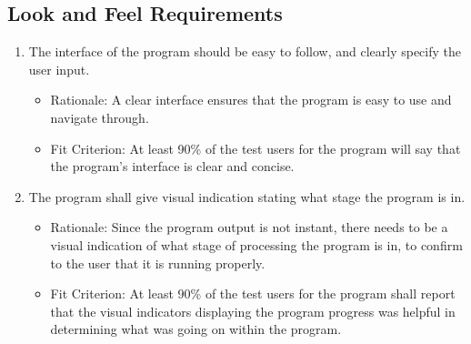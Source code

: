 \documentclass[12pt, titlepage]{article}
\begin{document}
\subsection{Look and Feel Requirements}
\begin{enumerate}[{LF}1. ] 
    \item \label{LF1} The interface of the program should be easy to follow, and clearly specify the user input.
    \begin{itemize} 
        \item Rationale: A clear interface ensures that the program is easy to use and navigate through.
        \item Fit Criterion: At least 90\% of the test users for the program will say that the program's interface is clear and concise.
    \end{itemize}  
    \item \label{LF2} The program shall give visual indication stating what stage the program is in.
    \begin{itemize} 
        \item Rationale: Since the program output is not instant, there needs to be a visual indication of what stage of processing the program is in, to confirm to the user that it is running properly.
        \item Fit Criterion: At least 90\% of the test users for the program shall report that the visual indicators displaying the program progress was helpful in determining what was going on within the program.
    \end{itemize}
\end{enumerate}
\end{document}
